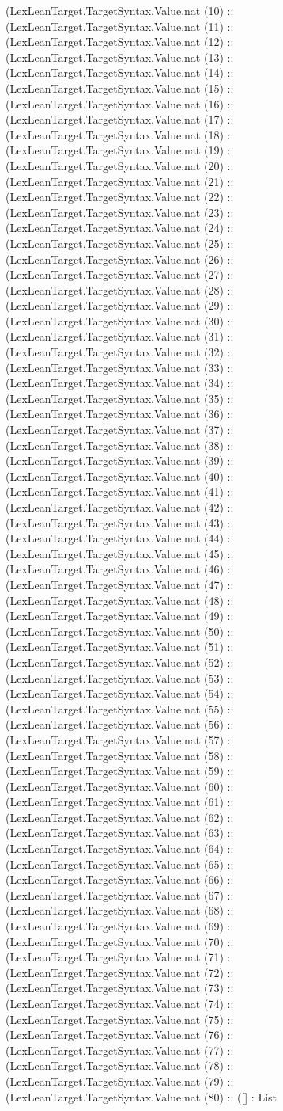 \documentclass[11pt]{article}
\begin{document}
(LexLeanTarget.TargetSyntax.Value.nat (10) :: (LexLeanTarget.TargetSyntax.Value.nat (11) :: (LexLeanTarget.TargetSyntax.Value.nat (12) :: (LexLeanTarget.TargetSyntax.Value.nat (13) :: (LexLeanTarget.TargetSyntax.Value.nat (14) :: (LexLeanTarget.TargetSyntax.Value.nat (15) :: (LexLeanTarget.TargetSyntax.Value.nat (16) :: (LexLeanTarget.TargetSyntax.Value.nat (17) :: (LexLeanTarget.TargetSyntax.Value.nat (18) :: (LexLeanTarget.TargetSyntax.Value.nat (19) :: (LexLeanTarget.TargetSyntax.Value.nat (20) :: (LexLeanTarget.TargetSyntax.Value.nat (21) :: (LexLeanTarget.TargetSyntax.Value.nat (22) :: (LexLeanTarget.TargetSyntax.Value.nat (23) :: (LexLeanTarget.TargetSyntax.Value.nat (24) :: (LexLeanTarget.TargetSyntax.Value.nat (25) :: (LexLeanTarget.TargetSyntax.Value.nat (26) :: (LexLeanTarget.TargetSyntax.Value.nat (27) :: (LexLeanTarget.TargetSyntax.Value.nat (28) :: (LexLeanTarget.TargetSyntax.Value.nat (29) :: (LexLeanTarget.TargetSyntax.Value.nat (30) :: (LexLeanTarget.TargetSyntax.Value.nat (31) :: (LexLeanTarget.TargetSyntax.Value.nat (32) :: (LexLeanTarget.TargetSyntax.Value.nat (33) :: (LexLeanTarget.TargetSyntax.Value.nat (34) :: (LexLeanTarget.TargetSyntax.Value.nat (35) :: (LexLeanTarget.TargetSyntax.Value.nat (36) :: (LexLeanTarget.TargetSyntax.Value.nat (37) :: (LexLeanTarget.TargetSyntax.Value.nat (38) :: (LexLeanTarget.TargetSyntax.Value.nat (39) :: (LexLeanTarget.TargetSyntax.Value.nat (40) :: (LexLeanTarget.TargetSyntax.Value.nat (41) :: (LexLeanTarget.TargetSyntax.Value.nat (42) :: (LexLeanTarget.TargetSyntax.Value.nat (43) :: (LexLeanTarget.TargetSyntax.Value.nat (44) :: (LexLeanTarget.TargetSyntax.Value.nat (45) :: (LexLeanTarget.TargetSyntax.Value.nat (46) :: (LexLeanTarget.TargetSyntax.Value.nat (47) :: (LexLeanTarget.TargetSyntax.Value.nat (48) :: (LexLeanTarget.TargetSyntax.Value.nat (49) :: (LexLeanTarget.TargetSyntax.Value.nat (50) :: (LexLeanTarget.TargetSyntax.Value.nat (51) :: (LexLeanTarget.TargetSyntax.Value.nat (52) :: (LexLeanTarget.TargetSyntax.Value.nat (53) :: (LexLeanTarget.TargetSyntax.Value.nat (54) :: (LexLeanTarget.TargetSyntax.Value.nat (55) :: (LexLeanTarget.TargetSyntax.Value.nat (56) :: (LexLeanTarget.TargetSyntax.Value.nat (57) :: (LexLeanTarget.TargetSyntax.Value.nat (58) :: (LexLeanTarget.TargetSyntax.Value.nat (59) :: (LexLeanTarget.TargetSyntax.Value.nat (60) :: (LexLeanTarget.TargetSyntax.Value.nat (61) :: (LexLeanTarget.TargetSyntax.Value.nat (62) :: (LexLeanTarget.TargetSyntax.Value.nat (63) :: (LexLeanTarget.TargetSyntax.Value.nat (64) :: (LexLeanTarget.TargetSyntax.Value.nat (65) :: (LexLeanTarget.TargetSyntax.Value.nat (66) :: (LexLeanTarget.TargetSyntax.Value.nat (67) :: (LexLeanTarget.TargetSyntax.Value.nat (68) :: (LexLeanTarget.TargetSyntax.Value.nat (69) :: (LexLeanTarget.TargetSyntax.Value.nat (70) :: (LexLeanTarget.TargetSyntax.Value.nat (71) :: (LexLeanTarget.TargetSyntax.Value.nat (72) :: (LexLeanTarget.TargetSyntax.Value.nat (73) :: (LexLeanTarget.TargetSyntax.Value.nat (74) :: (LexLeanTarget.TargetSyntax.Value.nat (75) :: (LexLeanTarget.TargetSyntax.Value.nat (76) :: (LexLeanTarget.TargetSyntax.Value.nat (77) :: (LexLeanTarget.TargetSyntax.Value.nat (78) :: (LexLeanTarget.TargetSyntax.Value.nat (79) :: (LexLeanTarget.TargetSyntax.Value.nat (80) :: ([] : List 
\end{document}
